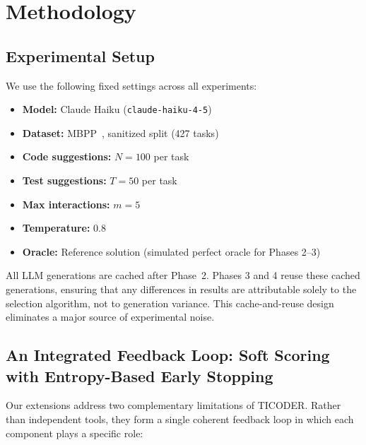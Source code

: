 \documentclass[conference]{IEEEtran}
\begin{document}
\section{Methodology}

\subsection{Experimental Setup}

We use the following fixed settings across all experiments:

\begin{itemize}
    \item \textbf{Model:} Claude Haiku (\texttt{claude-haiku-4-5})
    \item \textbf{Dataset:} MBPP~\cite{austin2021mbpp}, sanitized split (427 tasks)
    \item \textbf{Code suggestions:} $N = 100$ per task
    \item \textbf{Test suggestions:} $T = 50$ per task
    \item \textbf{Max interactions:} $m = 5$
    \item \textbf{Temperature:} 0.8
    \item \textbf{Oracle:} Reference solution (simulated perfect oracle for Phases 2--3)
\end{itemize}

All LLM generations are cached after Phase~2. Phases 3 and 4 reuse these cached generations, ensuring that any differences in results are attributable solely to the selection algorithm, not to generation variance. This cache-and-reuse design eliminates a major source of experimental noise.

\subsection{An Integrated Feedback Loop: Soft Scoring with Entropy-Based Early Stopping}

Our extensions address two complementary limitations of TICODER. Rather than independent tools, they form a single coherent feedback loop in which each component plays a specific role:
\end{document}

